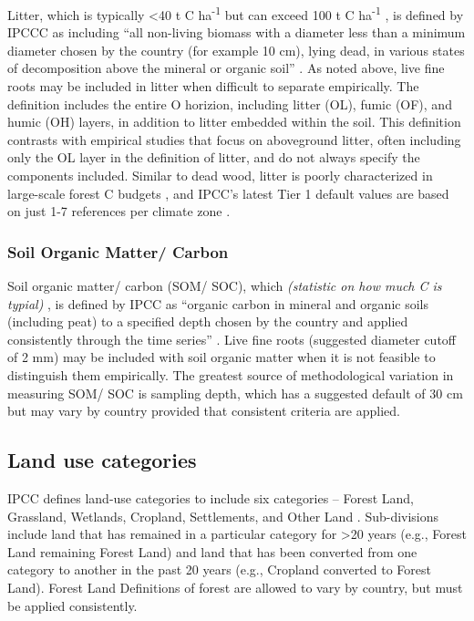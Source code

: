 \documentclass[, manuscript]{copernicus}
\begin{document}
Litter, which is typically \textless40 t C ha\textsuperscript{-1} but
can exceed 100 t C ha\textsuperscript{-1}
\citep{anderson-teixeira_carbon_2021}, is defined by IPCCC as including
``all non-living biomass with a diameter less than a minimum diameter
chosen by the country (for example 10 cm), lying dead, in various states
of decomposition above the mineral or organic soil''
\citep{ipcc_good_2003, ipcc_2006_2006}. As noted above, live fine roots
may be included in litter when difficult to separate empirically. The
definition includes the entire O horizion, including litter (OL), fumic
(OF), and humic (OH) layers, in addition to litter embedded within the
soil. This definition contrasts with empirical studies that focus on
aboveground litter, often including only the OL layer in the definition
of litter, and do not always specify the components included. Similar to
dead wood, litter is poorly characterized in large-scale forest C
budgets \citep{pan_large_2011, harris_global_2021}, and IPCC's latest
Tier 1 default values are based on just 1-7 references per climate zone
\citep[Table 2.2 in][]{ipcc_2019_2019}.

\subsubsection{Soil Organic Matter/ Carbon}

Soil organic matter/ carbon (SOM/ SOC), which \emph{(statistic on how
much C is typial)} \citep{ref}, is defined by IPCC as ``organic carbon
in mineral and organic soils (including peat) to a specified depth
chosen by the country and applied consistently through the time series''
\citep{ipcc_good_2003, ipcc_2006_2006}. Live fine roots (suggested
diameter cutoff of 2 mm) may be included with soil organic matter when
it is not feasible to distinguish them empirically. The greatest source
of methodological variation in measuring SOM/ SOC is sampling depth,
which has a suggested default of 30 cm but may vary by country provided
that consistent criteria are applied.

\subsection{Land use categories}

IPCC defines land-use categories to include six categories -- Forest
Land, Grassland, Wetlands, Cropland, Settlements, and Other Land
\citep{ipcc_2006_2006}. Sub-divisions include land that has remained in
a particular category for \textgreater20 years (e.g., Forest Land
remaining Forest Land) and land that has been converted from one
category to another in the past 20 years (e.g., Cropland converted to
Forest Land). Forest Land Definitions of forest are allowed to vary by
country, but must be applied consistently.
\end{document}

